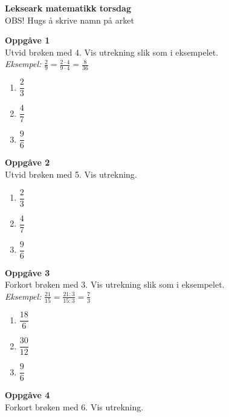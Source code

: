 \documentclass[english,hidelinks,pdftex, 11 pt, class=report,crop=false]{standalone}
\begin{document}
\huge \textbf{Lekseark matematikk torsdag}\\
\footnotesize OBS! Hugs å skrive namn på arket \\[25pt]
\large

{\Large \textbf{Oppgåve 1}}\\[10pt]
Utvid brøken med 4. Vis utrekning slik som i eksempelet. \\[10pt]
\textit{Eksempel:} $ \displaystyle
\frac{2}{9}=\frac{2\cdot4}{9\cdot4}=\frac{8}{36}$ \\[10pt]
\begin{enumerate}[label=\alph*)]
	\item $\displaystyle \dfrac{2}{3} $\\[10pt]
	\item $\displaystyle \dfrac{4}{7}$\\[10pt]
	\item $\displaystyle \dfrac{9}{6} $\\[10pt]
\end{enumerate}

{\Large \textbf{Oppgåve 2}}\\[10pt]
Utvid brøken med 5. Vis utrekning. \\
\begin{enumerate}[label=\alph*)]
	\item $\displaystyle \dfrac{2}{3} $\\[10pt]
	\item $\displaystyle \dfrac{4}{7}$\\[10pt]
	\item $\displaystyle \dfrac{9}{6} $\\[10pt]	
\end{enumerate}
{\Large \textbf{Oppgåve 3}}\\[10pt]
Forkort brøken med 3. Vis utrekning slik som i eksempelet. \\[10pt]
\textit{Eksempel:} $ \displaystyle
\frac{21}{15}=\frac{21:3}{15:3}=\frac{7}{3}$ \\[10pt]
\begin{enumerate}[label=\alph*)]
	\item $\displaystyle \dfrac{18}{6} $\\[10pt]
	\item $\displaystyle \dfrac{30}{12}$\\[10pt]
	\item $\displaystyle \dfrac{9}{6} $
\end{enumerate}

\newpage
{\Large \textbf{Oppgåve 4}}\\[10pt]
Forkort brøken med 6. Vis utrekning. \\
\end{document}
